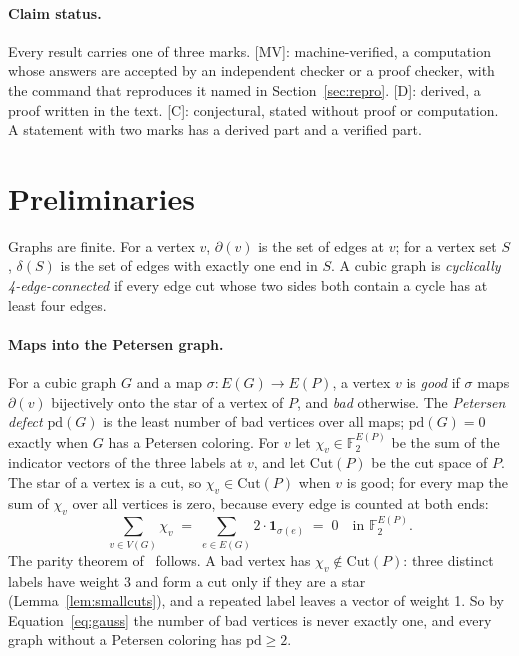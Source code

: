\documentclass[11pt]{article}
\theoremstyle{definition}
\theoremstyle{remark}
\newcommand{\PG}{P}
\newcommand{\pd}{\mathrm{pd}}
\newcommand{\Cut}{\mathrm{Cut}}
\newcommand{\claim}[1]{\textup{[#1]}}
\begin{document}
\paragraph{Claim status.} Every result carries one of three marks. \claim{MV}: machine-verified, a
computation whose answers are accepted by an independent checker or a proof checker, with the command
that reproduces it named in Section~\ref{sec:repro}. \claim{D}: derived, a proof written in the text.
\claim{C}: conjectural, stated without proof or computation. A statement with two marks has a derived
part and a verified part.



\section{Preliminaries}\label{sec:prelim}

Graphs are finite. For a vertex $v$, $\partial(v)$ is the set of edges at $v$; for a vertex set
$S$, $\delta(S)$ is the set of edges with exactly one end in $S$. A cubic graph is
\emph{cyclically 4-edge-connected} if every edge cut whose two sides both contain a cycle has at
least four edges.

\paragraph{Maps into the Petersen graph.} For a cubic graph $G$ and a map $\sigma : E(G) \to
E(\PG)$, a vertex $v$ is \emph{good} if $\sigma$ maps $\partial(v)$ bijectively onto the star of a
vertex of $\PG$, and \emph{bad} otherwise. The \emph{Petersen defect} $\pd(G)$ is the least number of
bad vertices over all maps; $\pd(G) = 0$ exactly when $G$ has a Petersen coloring. For $v$ let
$\chi_v \in \mathbb{F}_2^{E(\PG)}$ be the sum of the indicator vectors of the three labels at $v$,
and let $\Cut(\PG)$ be the cut space of $\PG$. The star of a vertex is a cut, so $\chi_v \in
\Cut(\PG)$ when $v$ is good; for every map the sum of $\chi_v$ over all vertices is zero, because
every edge is counted at both ends:
\begin{equation}\label{eq:gauss}
\sum_{v \in V(G)} \chi_v \;=\; \sum_{e \in E(G)} 2\cdot\mathbf{1}_{\sigma(e)} \;=\; 0 \quad\text{in } \mathbb{F}_2^{E(\PG)} .
\end{equation}
The parity theorem of~\cite{Audit2026} follows. A bad vertex has $\chi_v \notin \Cut(\PG)$: three distinct labels
have weight 3 and form a cut only if they are a star (Lemma~\ref{lem:smallcuts}), and a repeated label leaves a vector of weight 1.
So by Equation~\eqref{eq:gauss} the number of bad vertices is never exactly one, and
every graph without a Petersen coloring has $\pd \ge 2$.
\end{document}
